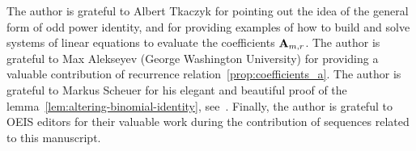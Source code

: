 The author is grateful to Albert Tkaczyk for pointing out the idea of the general form of odd power identity,
and for providing examples of how to build and solve systems of linear equations to evaluate
the coefficients ${\mathbf{A}} \sb{m,r}$.
The author is grateful to Max Alekseyev (George Washington University) for providing a valuable contribution
of recurrence relation~\eqref{prop:coefficients_a}.
The author is grateful to Markus Scheuer for his elegant and beautiful proof
of the lemma~\eqref{lem:altering-binomial-identity}, see~\cite{scheuer2023mathstackexchange}.
Finally, the author is grateful to OEIS editors for their valuable work during the contribution of sequences
related to this manuscript.
